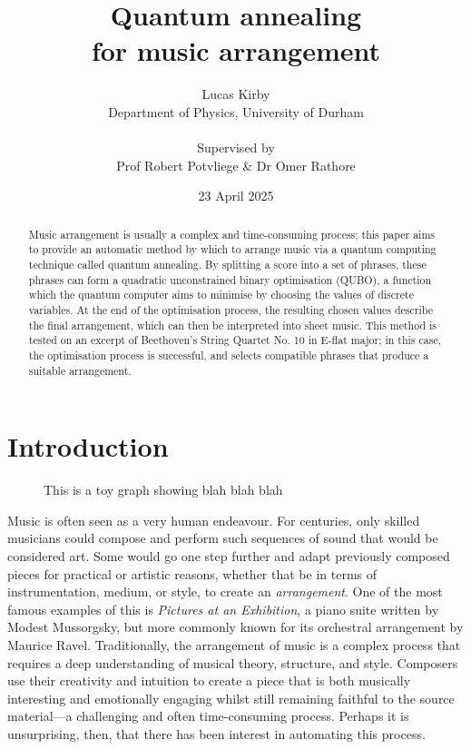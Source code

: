 \documentclass[12pt]{article}
\title{\Huge \bfseries Quantum annealing\\for music arrangement}
\author{Lucas Kirby\\\normalsize Department of Physics, University of Durham\\\\\normalsize Supervised by\\\normalsize Prof Robert Potvliege \& Dr Omer Rathore}
\date{\normalsize 23 April 2025}
\theoremstyle{definition}
\begin{document}
\maketitle

\vfill

\begin{abstract}              

Music arrangement is usually a complex and time-consuming process; this paper aims to provide an automatic method by which to arrange music via a quantum computing technique called quantum annealing. By splitting a score into a set of phrases, these phrases can form a quadratic unconstrained binary optimisation (QUBO), a function which the quantum computer aims to minimise by choosing the values of discrete variables. At the end of the optimisation process, the resulting chosen values describe the final arrangement, which can then be interpreted into sheet music. This method is tested on an excerpt of Beethoven's String Quartet No. 10 in E-flat major; in this case, the optimisation process is successful, and selects compatible phrases that produce a suitable arrangement.

\end{abstract}

\vfill

\begin{center}
    
\end{center}

\thispagestyle{empty}
\clearpage

\tableofcontents
\listoffigures
\listoftables

\thispagestyle{empty}
\clearpage

\section{Introduction}

\begin{figure}
    \small
    
    \caption[Toy graph]{This is a toy graph showing blah blah blah}
\end{figure}

Music is often seen as a very human endeavour. For centuries, only skilled musicians could compose and perform such sequences of sound that would be considered art. Some would go one step further and adapt previously composed pieces for practical or artistic reasons, whether that be in terms of instrumentation, medium, or style, to create an \textit{arrangement}. One of the most famous examples of this is \textit{Pictures at an Exhibition}, a piano suite written by Modest Mussorgsky, but more commonly known for its orchestral arrangement by Maurice Ravel.
Traditionally, the arrangement of music is a complex process that requires a deep understanding of musical theory, structure, and style. Composers use their creativity and intuition to create a piece that is both musically interesting and emotionally engaging whilst still remaining faithful to the source material—a challenging and often time-consuming process. Perhaps it is unsurprising, then, that there has been interest in automating this process.
\end{document}
